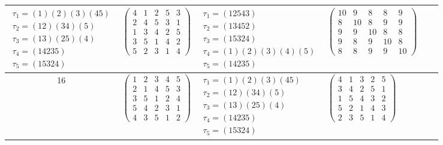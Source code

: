 \begin{longtable}{|c|p{2.7cm}|p{2.7cm}|p{2.7cm}|p{2.7cm}|p{3.3cm}|}
    $\begin{array}{l}\tau_{1}=(1)(2)(3)(45)\\ \tau_{2}=(12)(34)(5)\\ \tau_{3}=(13)(25)(4)\\ \tau_{4}=(14235)\\ \tau_{5}=(15324)\end{array}$     &
    $\begin{pmatrix}4&1&2&5&3\\2&4&5&3&1\\1&3&4&2&5\\3&5&1&4&2\\5&2&3&1&4\end{pmatrix}$                                                         &
    $\begin{array}{l}\tau_{1}=(12543)\\ \tau_{2}=(13452)\\ \tau_{3}=(15324)\\ \tau_{4}=(1)(2)(3)(4)(5)\\ \tau_{5}=(14235)\end{array}$           &
    $\begin{pmatrix}10&9&8&8&9\\8&10&8&9&9\\9&9&10&8&8\\9&8&9&10&8\\8&8&9&9&10\end{pmatrix}$                                                                                                                                \\
    \hline
    16                                                                                                                                          &
    $\begin{pmatrix}1&2&3&4&5\\2&1&4&5&3\\3&5&1&2&4\\5&4&2&3&1\\4&3&5&1&2\end{pmatrix}$                                                         &
    $\begin{array}{l}\tau_{1}=(1)(2)(3)(45)\\ \tau_{2}=(12)(34)(5)\\ \tau_{3}=(13)(25)(4)\\ \tau_{4}=(14235)\\ \tau_{5}=(15324)\end{array}$     &
    $\begin{pmatrix}4&1&3&2&5\\3&4&2&5&1\\1&5&4&3&2\\5&2&1&4&3\\2&3&5&1&4\end{pmatrix}$                                                         &

\end{longtable}
